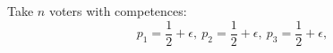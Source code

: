 \documentclass[preview, border={0pt 5pt 3pt 1pt}, varwidth=15.5cm]{standalone} %
\begin{document}








    Take \(n\) voters with competences:
    \[
        p_1 = \frac{1}{2} + \epsilon,~p_2 = \frac{1}{2} + \epsilon,~p_3 = \frac{1}{2} + \epsilon,
    \]



\end{document}
